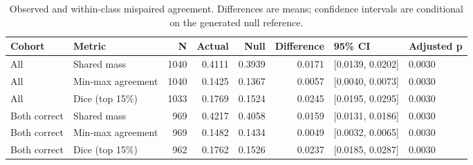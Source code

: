 \begin{table}[t]
\caption{Observed and within-class mispaired agreement. Differences are means; confidence intervals are conditional on the generated null reference.}
\label{tab:03_overall_chance_calibration}
\begin{tabular}{llrrrrll}
\toprule
Cohort & Metric & N & Actual & Null & Difference & 95\% CI & Adjusted p \\
\midrule
All & Shared mass & 1040 & 0.4111 & 0.3939 & 0.0171 & [0.0139, 0.0202] & 0.0030 \\
All & Min-max agreement & 1040 & 0.1425 & 0.1367 & 0.0057 & [0.0040, 0.0073] & 0.0030 \\
All & Dice (top 15\%) & 1033 & 0.1769 & 0.1524 & 0.0245 & [0.0195, 0.0295] & 0.0030 \\
Both correct & Shared mass & 969 & 0.4217 & 0.4058 & 0.0159 & [0.0131, 0.0186] & 0.0030 \\
Both correct & Min-max agreement & 969 & 0.1482 & 0.1434 & 0.0049 & [0.0032, 0.0065] & 0.0030 \\
Both correct & Dice (top 15\%) & 962 & 0.1762 & 0.1526 & 0.0237 & [0.0185, 0.0287] & 0.0030 \\
\bottomrule
\end{tabular}
\end{table}
